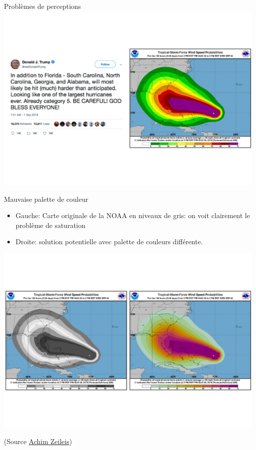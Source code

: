\documentclass[
  ignorenonframetext,
]{beamer}
\begin{document}
\begin{frame}{Problèmes de perceptions}
\protect\hypertarget{probluxe8mes-de-perceptions}{}
\includegraphics{MATH60602-diapos1_files/figure-beamer/unnamed-chunk-13-1.pdf}
\end{frame}

\begin{frame}{Mauvaise palette de couleur}
\protect\hypertarget{mauvaise-palette-de-couleur}{}
\begin{itemize}
\item
  Gauche: Carte originale de la NOAA en niveaux de gris: on voit
  clairement le problème de saturation
\item
  Droite: solution potentielle avec palette de couleurs différente.
\end{itemize}

\includegraphics{MATH60602-diapos1_files/figure-beamer/unnamed-chunk-14-1.pdf}

(Source \href{https://www.zeileis.org/news/dorian_rainbow/}{Achim
Zeileis})
\end{frame}
\end{document}
